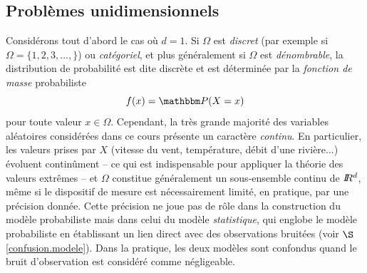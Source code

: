 \subsection{Probl\`emes unidimensionnels}\label{unidim.chap1}

Consid\'erons tout d'abord le cas o\`u $d=1$. Si $\Omega$ est {\it discret} (par exemple si $\Omega=\{1,2,3,\ldots,\}$) ou {\it cat\'egoriel}, et plus g\'en\'eralement si $\Omega$ est {\it d\'enombrable}, la distribution de probabilit\'e est dite discr\`ete et est d\'etermin\'ee par la {\it fonction de masse} probabiliste 
$$
f(x) = \Pm(X=x)
$$
pour toute valeur $x\in\Omega$. Cependant, la tr\`es grande majorit\'e des variables al\'eatoires consid\'er\'ees dans ce cours pr\'esente un caract\`ere {\it continu}. En particulier, les valeurs prises par $X$ (vitesse du vent, temp\'erature, d\'ebit d'une rivi\`ere...) \'evoluent contin\^ument -- ce qui est indispensable pour appliquer la th\'eorie des valeurs extr\^emes -- et $\Omega$ constitue g\'en\'eralement un sous-ensemble continu de $I\!\!R^d$, m\^eme si le dispositif de mesure est n\'ecessairement limit\'e, en pratique, par une pr\'ecision donn\'ee. Cette pr\'ecision ne joue pas de r\^ole dans la construction du mod\`ele probabiliste mais dans celui du mod\`ele {\it statistique}, qui englobe le mod\`ele probabiliste en \'etablissant un lien direct avec des observations bruit\'ees (voir $\S$ \ref{confusion.modele}). Dans la pratique, les deux  mod\`eles sont  confondus quand le bruit d'observation est consid\'er\'e comme n\'egligeable. \\

